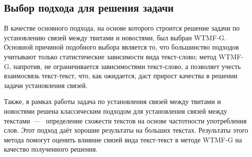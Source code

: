 \subsection{Выбор подхода для решения задачи}
    В качестве основного подхода, на основе которого строится решение задачи по установлению связей между твитами и новостями, был выбран WTMF-G.
    Основной причиной подобного выбора является то, что большинство подходов учитывают только статистические зависимости вида текст-слово;
    метод WTMF-G, напротив, не ограничивается зависимостями текст-слово, а позволяет учесть взаимосвязь текст-текст,
    что, как ожидается, даст прирост качества в решении задачи установления связей.

    Также, в рамках работы задача по установления связей между твитами и новостями решена классическим подходом для установления связей между текстами~---~
    определение схожести текстов на основе частотности употребления слов. Этот подход даёт хорошие результаты на больших текстах.
    Результаты этого метода помогут оценить влияние связей вида текст-текст в методе WTMF-G на качество полученного решения.


